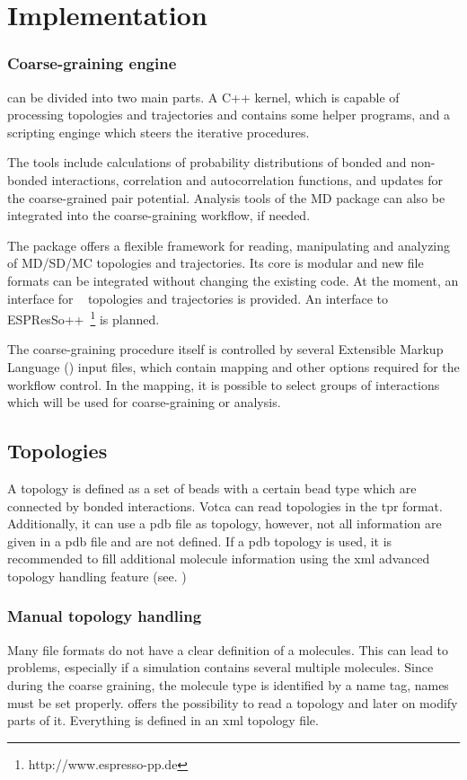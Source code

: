 \chapter{Implementation}
\subsection{Coarse-graining engine}
\votca can be divided into two main parts. A C++ kernel, which is capable of processing topologies and trajectories and contains some helper programs, and a scripting enginge which steers the iterative procedures.

The tools include calculations of probability distributions of bonded and non-bonded interactions, correlation and autocorrelation functions, and updates for the coarse-grained pair potential. Analysis tools of the MD package can also be integrated into the coarse-graining workflow, if needed.

The package offers a flexible framework for reading, manipulating and analyzing of MD/SD/MC topologies and trajectories. Its core is modular and new file formats can be integrated without changing the existing code. At the moment, an interface for \gromacs~\cite{gromacs4} topologies and trajectories is provided. An interface to ESPResSo++~\footnote{{\rm http://www.espresso-pp.de} } is planned.

The coarse-graining procedure itself is controlled by several Extensible Markup Language (\xml) input files, which contain mapping and other options required for the workflow control. In the mapping, it is possible to select groups of interactions which will be used for coarse-graining or analysis. 



\section{Topologies}
A topology is defined as a set of beads with a certain bead type which are connected by bonded interactions.
Votca can read topologies in the \gromacs tpr format. Additionally, it can use a pdb file as topology, however, not all information are given in a pdb file and are not defined. If a pdb topology is used, it is recommended to fill additional molecule information using the xml advanced topology handling feature (see. )
\subsection{Manual topology handling}
\label{sec:adv_topology}
Many file formats do not have a clear definition of a molecules. This can lead to problems, especially if a simulation contains several multiple molecules. Since during the coarse graining, the molecule type is identified by a name tag, names must be set properly. \votca offers the possibility to read a topology and later on modify parts of it. Everything is defined in an xml topology file.

